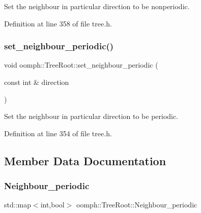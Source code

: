 Set the neighbour in particular direction to be nonperiodic. 



Definition at line 358 of file tree.\+h.

\mbox{\label{classoomph_1_1TreeRoot_ad4a2c51b2b42261bd8dde67ca32c594c}} 
\subsubsection{\texorpdfstring{set\+\_\+neighbour\+\_\+periodic()}{set\_neighbour\_periodic()}}
{\footnotesize\ttfamily void oomph\+::\+Tree\+Root\+::set\+\_\+neighbour\+\_\+periodic (\begin{DoxyParamCaption}\item[{const int \&}]{direction }\end{DoxyParamCaption})\hspace{0.3cm}{\ttfamily [inline]}}



Set the neighbour in particular direction to be periodic. 



Definition at line 354 of file tree.\+h.



\subsection{Member Data Documentation}
\mbox{\label{classoomph_1_1TreeRoot_a735d46a67142786a3368d0e719513c03}} 
\subsubsection{\texorpdfstring{Neighbour\+\_\+periodic}{Neighbour\_periodic}}
{\footnotesize\ttfamily std\+::map$<$int,bool$>$ oomph\+::\+Tree\+Root\+::\+Neighbour\+\_\+periodic\hspace{0.3cm}{\ttfamily [protected]}}



